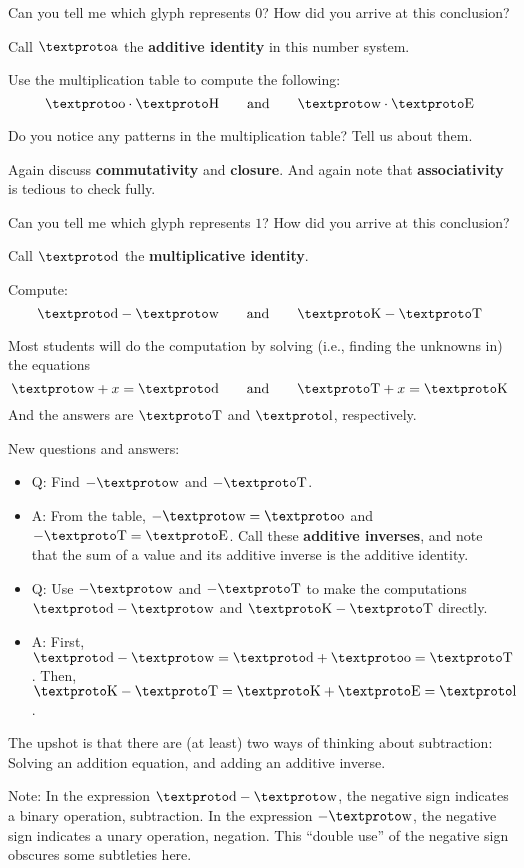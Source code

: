 \documentclass{ximera}
\begin{document}
\begin{problem} 
Can you tell me which glyph represents $0$? How did you arrive at this
conclusion?
\begin{teachingnote}
Call $\lo$ the \textbf{additive identity} in this number system.
\end{teachingnote}
\end{problem}

\begin{problem} 
Use the multiplication table to compute the following:
\[
\li \cdot \lb \qquad\text{and}\qquad \la \cdot \lf
\]
\end{problem}

\begin{problem} 
Do you notice any patterns in the multiplication table? Tell us about them.
\begin{teachingnote}
Again discuss \textbf{commutativity} and \textbf{closure}.  And again note that \textbf{associativity} is tedious to check fully.  
\end{teachingnote}

\end{problem}

\begin{problem} 
Can you tell me which glyph represents $1$? How did you arrive at this
conclusion?
\begin{teachingnote}
Call $\loo$ the \textbf{multiplicative identity}.  
\end{teachingnote}
\end{problem}


\begin{problem} Compute:
\[
\loo - \la \qquad\text{and}\qquad \ld - \lc
\]
\begin{teachingnote}
Most students will do the computation by solving (i.e., finding the unknowns in) the equations  
\[
\la + x = \loo  \qquad\text{and}\qquad \lc + x = \ld
\]
And the answers are $\lc$ and $\lh$, respectively.  

New questions and answers:  
\begin{itemize}
\item Q: Find $-\la$ and $-\lc$.  
\item A: From the table, $-\la=\li$ and $-\lc=\lf$.  Call these \textbf{additive inverses}, and note that the sum of a value and its additive inverse is the additive identity.  
\item Q: Use $-\la$ and $-\lc$ to make the computations $\loo - \la$ and $\ld - \lc$ directly. 
\item A: First, $\loo - \la = \loo + \li =\lc$.  Then, $\ld - \lc = \ld + \lf = \lh$.  
\end {itemize}

The upshot is that there are (at least) two ways of thinking about subtraction:  Solving an addition equation, and adding an additive inverse.  

Note: In the expression $\loo - \la$, the negative sign indicates a binary operation, subtraction.  In the expression $-\la$, the negative sign indicates a unary operation, negation.  This ``double use'' of the negative sign obscures some subtleties here.  
\end{teachingnote}
\end{problem}
\end{document}
